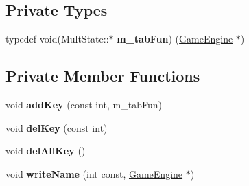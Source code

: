 \subsection*{Private Types}
\begin{DoxyCompactItemize}
\item 
\hypertarget{class_mult_state_a25eb0c2456035e64b64b8cee7088b90b}{}typedef void(Mult\+State\+::$\ast$ {\bfseries m\+\_\+tab\+Fun}) (\hyperlink{class_game_engine}{Game\+Engine} $\ast$)\label{class_mult_state_a25eb0c2456035e64b64b8cee7088b90b}

\end{DoxyCompactItemize}
\subsection*{Private Member Functions}
\begin{DoxyCompactItemize}
\item 
\hypertarget{class_mult_state_a422a9a0d72cf9f952557cd299269e567}{}void {\bfseries add\+Key} (const int, m\+\_\+tab\+Fun)\label{class_mult_state_a422a9a0d72cf9f952557cd299269e567}

\item 
\hypertarget{class_mult_state_abf4b8e956bb9fe79ce7c896fd599bc43}{}void {\bfseries del\+Key} (const int)\label{class_mult_state_abf4b8e956bb9fe79ce7c896fd599bc43}

\item 
\hypertarget{class_mult_state_aadf4befe1ef19227b24f3d27250824ba}{}void {\bfseries del\+All\+Key} ()\label{class_mult_state_aadf4befe1ef19227b24f3d27250824ba}

\item 
\hypertarget{class_mult_state_a1df2a94cb5abeea43768677ca7592f27}{}void {\bfseries write\+Name} (int const, \hyperlink{class_game_engine}{Game\+Engine} $\ast$)\label{class_mult_state_a1df2a94cb5abeea43768677ca7592f27}

\end{DoxyCompactItemize}
